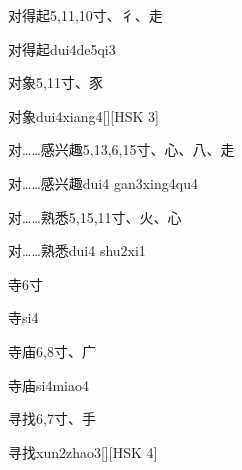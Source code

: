\begin{entry}{对得起}{5,11,10}{⼨、⼻、⾛}
  \begin{phonetics}{对得起}{dui4de5qi3}
  \end{phonetics}
\end{entry}

\begin{entry}{对象}{5,11}{⼨、⾗}
  \begin{phonetics}{对象}{dui4xiang4}[][HSK 3]
  \end{phonetics}
\end{entry}

\begin{entry}{对……感兴趣}{5,13,6,15}{⼨、⼼、⼋、⾛}
  \begin{phonetics}{对……感兴趣}{dui4 gan3xing4qu4}
  \end{phonetics}
\end{entry}

\begin{entry}{对……熟悉}{5,15,11}{⼨、⽕、⼼}
  \begin{phonetics}{对……熟悉}{dui4 shu2xi1}
  \end{phonetics}
\end{entry}

\begin{entry}{寺}{6}{⼨}
  \begin{phonetics}{寺}{si4}
  \end{phonetics}
\end{entry}

\begin{entry}{寺庙}{6,8}{⼨、⼴}
  \begin{phonetics}{寺庙}{si4miao4}
  \end{phonetics}
\end{entry}

\begin{entry}{寻找}{6,7}{⼨、⼿}
  \begin{phonetics}{寻找}{xun2zhao3}[][HSK 4]
  \end{phonetics}
\end{entry}

